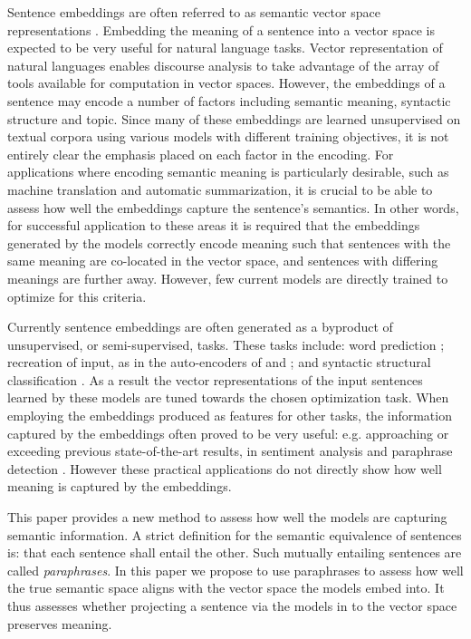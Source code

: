 \documentclass[]{book}
\begin{document}
Sentence embeddings are often referred to as semantic vector space
representations \cite{iyyer2014generating}. Embedding the meaning
of a sentence into a vector space is expected to be very useful for
natural language tasks. Vector representation of natural languages
enables discourse analysis to take advantage of the array of tools
available for computation in vector spaces. However, the embeddings
of a sentence may encode a number of factors including semantic meaning,
syntactic structure and topic. Since many of these embeddings are
learned unsupervised on textual corpora using various models with
different training objectives, it is not entirely clear the emphasis
placed on each factor in the encoding. For applications where encoding
semantic meaning is particularly desirable, such as machine translation
and automatic summarization, it is crucial to be able to assess how
well the embeddings capture the sentence's semantics. In other words,
for successful application to these areas it is required that the
embeddings generated by the models correctly encode meaning such that
sentences with the same meaning are co-located in the vector space,
and sentences with differing meanings are further away. However, few
current models are directly trained to optimize for this criteria.

Currently sentence embeddings are often generated as a byproduct of
unsupervised, or semi-supervised, tasks. These tasks include: word
prediction \cite{le2014distributed}; recreation of input, as in the
auto-encoders of \cite{SocherEtAl2011:RAE,SocherEtAl2011:PoolRAE}
and \cite{iyyer2014generating}; and syntactic structural classification
\cite{SocherEtAl2013:CVG,socher2010PhraseEmbedding}. As a result
the vector representations of the input sentences learned by these
models are tuned towards the chosen optimization task. When employing
the embeddings produced as features for other tasks, the information
captured by the embeddings often proved to be very useful: e.g. approaching
or exceeding previous state-of-the-art results, in sentiment analysis
\cite{SocherEtAl2011:RAE,SocherMVRNN,le2014distributed} and paraphrase
detection \cite{SocherEtAl2011:PoolRAE}. However these practical
applications do not directly show how well meaning is captured by
the embeddings.

This paper provides a new method to assess how well the models are
capturing semantic information. A strict definition for the semantic
equivalence of sentences is: that each sentence shall entail the other.
Such mutually entailing sentences are called \emph{paraphrases}. In
this paper we propose to use paraphrases to assess how well the true
semantic space aligns with the vector space the models embed into.
It thus assesses whether projecting a sentence via the models in to
the vector space preserves meaning.
\end{document}
